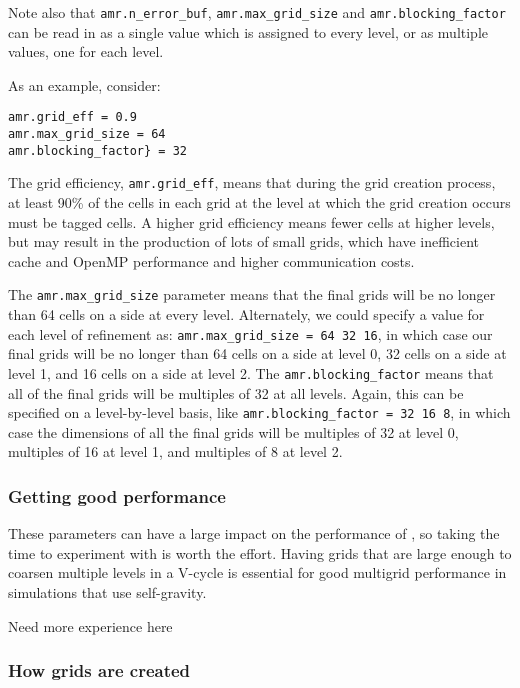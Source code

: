 Note also that {\tt amr.n\_error\_buf}, {\tt amr.max\_grid\_size} and
{\tt amr.blocking\_factor} can be read in as a single value which is
assigned to every level, or as multiple values, one for each level.

As an example, consider:
\begin{lstlisting}
amr.grid_eff = 0.9
amr.max_grid_size = 64 
amr.blocking_factor} = 32
\end{lstlisting}

The grid efficiency, {\tt amr.grid\_eff}, means that during the grid
creation process, at least 90\% of the cells in each grid at the level
at which the grid creation occurs must be tagged cells.  A higher
grid efficiency means fewer cells at higher levels, but may result
in the production of lots of small grids, which have inefficient cache
and OpenMP performance and higher communication costs.

The {\tt amr.max\_grid\_size} parameter means that the final grids
will be no longer than 64 cells on a side at every level.
Alternately, we could specify a value for each level of refinement as:
{\tt amr.max\_grid\_size = 64 32 16}, in which case our final grids
will be no longer than 64 cells on a side at level 0, 32 cells on a
side at level 1, and 16 cells on a side at level 2.  The {\tt amr.blocking\_factor}
means that all of the final grids will be multiples of 32 at all levels.
Again, this can be specified on a level-by-level basis, like
{\tt amr.blocking\_factor = 32 16 8}, in which case the 
dimensions of all the final grids will be multiples of 32
at level 0, multiples of 16 at level 1, and multiples of 8 at level 2.

\subsubsection{Getting good performance}

These parameters can have a large impact on the performance
of \castro, so taking the time to experiment with is worth the effort.
Having grids that are large enough to coarsen multiple levels in a
V-cycle is essential for good multigrid performance in simulations
that use self-gravity.

{\color{red} Need more experience here}

\subsubsection{How grids are created}

